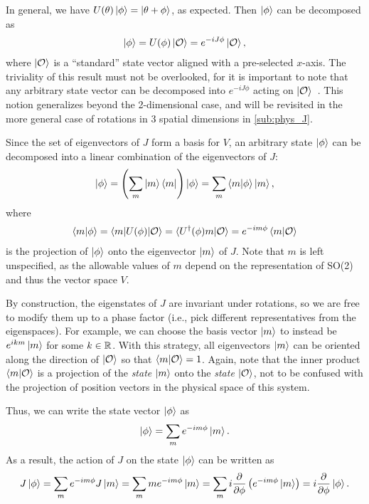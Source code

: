     In general, we have $U(\theta)\ket{\phi} = \ket{\theta+\phi}$, as expected. Then $\ket{\phi}$ can be decomposed as
    \begin{align*}
        \ket{\phi} = U(\phi)\ket{\mathcal{O}} = e^{-iJ\phi}\ket{\mathcal{O}},
    \end{align*}
    where $\ket{\mathcal{O}}$ is a ``standard'' state vector aligned with a pre-selected $x$-axis. The triviality of this result must not be overlooked, for it is important to note that any arbitrary state vector can be decomposed into $e^{-iJ\phi}$ acting on $\ket{\mathcal{O}}$~\cite{Tung1985}. This notion generalizes beyond the 2-dimensional case, and will be revisited in the more general case of rotations in 3 spatial dimensions in \cref{sub:phys_J}.

    Since the set of eigenvectors of $J$ form a basis for $V$, an arbitrary state $\ket{\phi}$ can be decomposed into a linear combination of the eigenvectors of $J$:
    \begin{align*}
        \ket{\phi} = \left( \sum_{m} \ket{m}\bra{m} \right)\ket{\phi} = \sum_{m} \braket{m|\phi}\ket{m},
    \end{align*}
    where
    \begin{align*}
        \braket{m|\phi} = \braket{m|U(\phi)|\mathcal{O}} = \braket{U^\dagger(\phi)m|\mathcal{O}} = e^{-im\phi}\braket{m|\mathcal{O}}
    \end{align*}
    is the projection of $\ket{\phi}$ onto the eigenvector $\ket{m}$ of $J$. Note that $m$ is left unspecified, as the allowable values of $m$ depend on the representation of SO(2) and thus the vector space $V$.

    By construction, the eigenstates of $J$ are invariant under rotations, so we are free to modify them up to a phase factor (i.e., pick  different representatives from the eigenspaces). For example, we can choose the basis vector $\ket{m}$ to instead be $e^{ikm}\ket{m}$ for some $k\in\mathbb{R}$.  With this strategy, all eigenvectors $\ket{m}$ can be oriented along the direction of $\ket{\mathcal{O}}$ so that $\braket{m|\mathcal{O}} = 1$. Again, note that the inner product $\braket{m|\mathcal{O}}$ is a projection of the \textit{state} $\ket{m}$ onto the \textit{state} $\ket{\mathcal{O}}$, not to be confused with the projection of position vectors in the physical space of this system.

    Thus, we can write the state vector $\ket{\phi}$ as
    \begin{align}
        \ket{\phi} = \sum_{m} e^{-im\phi}\ket{m}.\label{eq:phi2m}
    \end{align}
    As a result, the action of $J$ on the state $\ket{\phi}$ can be written as
    \begin{align*}
        J\ket{\phi} = \sum_{m} e^{-im\phi} J\ket{m} = \sum_{m} m e^{-im\phi}\ket{m} = \sum_{m} i \frac{\partial}{\partial\phi} \left( e^{-im\phi}\ket{m} \right) = i\frac{\partial}{\partial\phi}\ket{\phi}.
    \end{align*}

